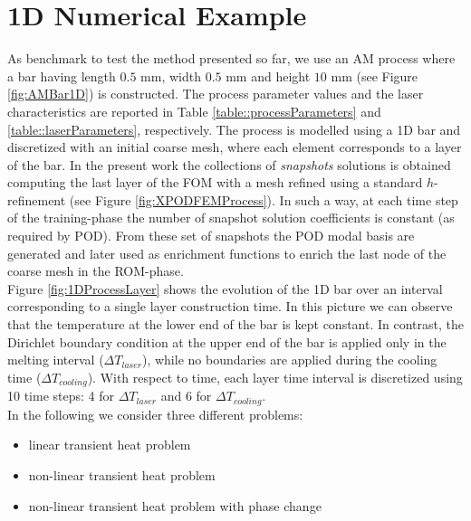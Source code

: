 \documentclass[3p]{article}
\begin{document}
\section*{1D Numerical Example}
As benchmark to test the method presented so far, we use an AM process where a bar having length $0.5$ mm, width $0.5$ mm and height $10$ mm (see Figure \ref{fig:AMBar1D}) is constructed. The process parameter values and the laser characteristics are reported in Table \ref{table::processParameters} and \ref{table::laserParameters}, respectively. The process is modelled using a 1D bar and discretized with an initial coarse mesh, where each element corresponds to a layer of the bar. In the present work the collections of \textit{snapshots} solutions is obtained computing the last layer of the FOM with a mesh refined using a standard $h$-refinement (see Figure \ref{fig:XPODFEMProcess}). In such a way, at each time step of the training-phase the number of snapshot solution coefficients is constant (as required by POD). From these set of snapshots the POD modal basis are generated and later used as enrichment functions to enrich the last node of the coarse mesh in the ROM-phase. 
\\ \indent Figure \ref{fig:1DProcessLayer} shows the evolution of the 1D bar over an interval corresponding to a single layer construction time. In this picture we can observe that the temperature at the lower end of the bar is kept constant. In contrast, the Dirichlet boundary condition at the upper end of the bar is applied only in the melting interval ($\Delta T_{laser}$), while no boundaries are applied during the cooling time ($\Delta T_{cooling}$). With respect to time, each layer time interval is discretized using 10 time steps: 4 for $\Delta T_{laser}$ and 6 for $\Delta T_{cooling}$. \\ In the following we consider three different problems:
\begin{itemize}
\item linear transient heat problem
\item non-linear transient heat problem
\item non-linear transient heat problem with phase change
\end{itemize}
\end{document}

